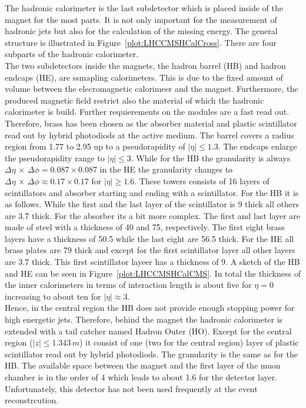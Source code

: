 The hadronic calorimeter is the last subdetector which is placed inside of the magnet for the most parts. It is not only important for the measurement of hadronic jets but also for the calculation of the missing energy. The general structure is illustrated in Figure~\ref{plot:LHCCMSHCalCross}. There are four subparts of the hadronic calorimeter.\\
The two subdetectors inside the magnets, the hadron barrel (HB) and hadron endcaps (HE), are ssmapling calorimeters. This is due to the fixed amount of volume between the elecromagnetic calorimeer and the magnet. Furthermore, the produced magnetic field restrict also the material of which the hadronic calorimeter is build. Further requierements on the modules are a fast read out. Therefore, brass has been chosen as the absorber material and plastic scintillator read out by hybrid photodiods at the active medium. The barrel covers a radius region from 1.77 to 2.95\m{} up to a pseudorapidity of $\left|\eta{}\right| \leq{} 1.3$. The endcaps enlarge the pseudorapidity range to $\left|\eta{}\right| \leq{} 3$. While for the HB the granularity is always $\Delta{}\eta\,\times\,\Delta{}\phi{} = 0.087 \times{} 0.087$ in the HE the granularity changes to $\Delta{}\eta\,\times\,\Delta{}\phi{} \approx 0.17 \times{} 0.17$ for $\left|\eta{}\right| \geq{} 1.6$. These towers consists of 16 layers of scintillators and absorber starting and ending with a scintillator. For the HB it is as follows. While the first and the last layer of the scintillator is 9\mm{} thick all others are 3.7\mm{} thick. For the absorber its a bit more complex. The first and last layer are made of steel with a thickness of 40\mm{} and 75\mm{}, respectively. The first eight brass layers have a thickness of 50.5\mm{} while the last eight are 56.5\mm{} thick. For the HE all brass plates are 79\mm{} thick and except for the first scintillator layer all other layers are 3.7\mm{} thick. This first scintillator layeer has a thickness of 9\mm{}. A sketch of the HB and HE can be seen in Figure~\ref{plot:LHCCMSHCalCMS}. In total the thickness of the inner calorimeters in terms of interaction length is about five for $\eta{}=0$ increasing to about ten for $\left|\eta{}\right|\approx{}3$.\\
Hence, in the central region the HB does not provide enough stopping power for high energetic jets. Therefore, behind the magnet the hadronic calorimeter is extended with a tail catcher named Hadron Outer (HO). Except for the central region ($\left|z\right| \leq{} 1.343\,m$) it consist of one (two for the central region) layer of plastic scintillator read out by hybrid photodiods. The granularity is the same as for the HB. The available space between the magnet and the first layer of the muon chamber is in the order of 4\cm{} which leads to about 1.6\cm{} for the detector layer. Unfortunately, this detector has not been used frequently at the event reconstrcution.
